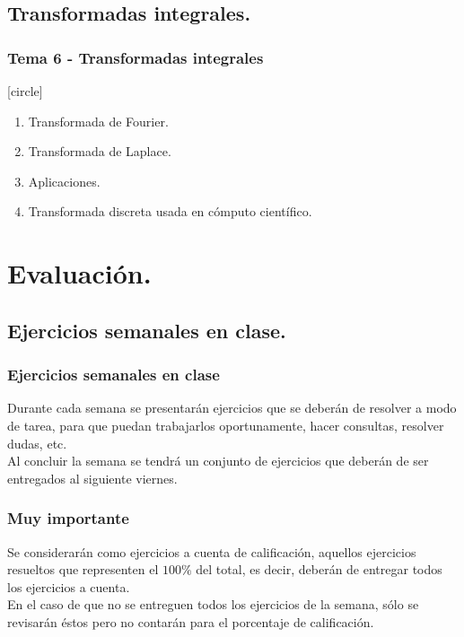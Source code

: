 \subsection{Transformadas integrales.}
\begin{frame}
\frametitle{Tema 6 - Transformadas integrales}
[circle]
\begin{enumerate}[<+->]
\item Transformada de Fourier.
\item Transformada de Laplace.
\item Aplicaciones.
\item Transformada discreta usada en cómputo científico.
\end{enumerate}
\end{frame}
\section{Evaluación.}
\subsection{Ejercicios semanales en clase.}
\begin{frame}
\frametitle{Ejercicios semanales en clase}
Durante cada semana se presentarán ejercicios que se deberán de resolver a modo de tarea, para que puedan trabajarlos oportunamente, hacer consultas, resolver dudas, etc.
\\
\bigskip
\pause
Al concluir la semana se tendrá un conjunto de ejercicios que deberán de ser entregados al siguiente viernes.
\end{frame}
\begin{frame}
\frametitle{Muy importante}
Se considerarán como ejercicios a cuenta de calificación, aquellos ejercicios resueltos que representen el $100\%$ del total, es decir, deberán de entregar todos los ejercicios a cuenta.
\\
\bigskip
\pause
En el caso de que no se entreguen todos los ejercicios de la semana, sólo se revisarán éstos pero no contarán para el porcentaje de calificación.
\end{frame}
